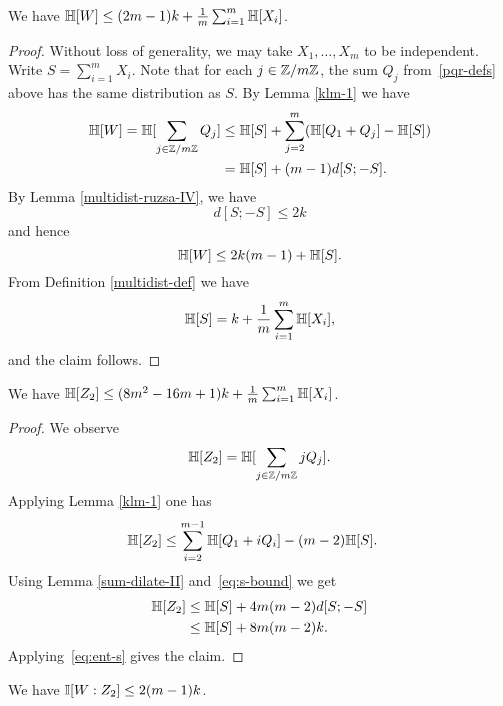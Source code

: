 \begin{lemma}[Entropy of $W$]\label{ent-w}  We have $\mathbb{H}[W] \leq (2m-1)k + \frac1m \sum_{i=1}^m \mathbb{H}[X_i]$.
\end{lemma}

\begin{proof} Without loss of generality, we may take $X_1,\dots,X_m$ to be independent. Write $S = \sum_{i=1}^m X_i$.
  Note that for each $j \in \mathbb{Z}/m\mathbb{Z}$, the sum $Q_j$ from~\eqref{pqr-defs} above has the same distribution as $S$.
  By Lemma \ref{klm-1} we have
  \begin{align*}
    \mathbb{H}[W] = \mathbb{H}[\sum_{j \in \mathbb{Z}/m\mathbb{Z}} Q_j]  & \leq \mathbb{H}[S] + \sum_{j=2}^m (\mathbb{H}[Q_1+Q_j] - \mathbb{H}[S]) \\ & = \mathbb{H}[S] + (m-1) d[S;-S].
  \end{align*}
  By Lemma \ref{multidist-ruzsa-IV}, we have
  \begin{equation}
    \label{eq:s-bound}
    d[S; -S] \leq 2 k
  \end{equation}
  and hence
  \[
    \mathbb{H}[W] \leq 2 k (m-1) + \mathbb{H}[S].
  \]
  From Definition \ref{multidist-def} we have
  \begin{equation}
    \label{eq:ent-s}
    \mathbb{H}[S] = k + \frac1m \sum_{i=1}^m \mathbb{H}[X_i],
  \end{equation}
  and the claim follows.
\end{proof}

\begin{lemma}[Entropy of $Z_2$]\label{ent-z2}  We have $\mathbb{H}[Z_2] \leq (8m^2-16m+1) k + \frac{1}{m} \sum_{i=1}^m \mathbb{H}[X_i]$.
\end{lemma}

\begin{proof}
  We observe
  \[
    \mathbb{H}[Z_2] = \mathbb{H}[\sum_{j \in \mathbb{Z}/m\mathbb{Z}} j Q_j].
  \]
  Applying Lemma \ref{klm-1} one has
  \begin{align*}
    \mathbb{H}[Z_2] &\leq \sum_{i=2}^{m-1} \mathbb{H}[Q_1 + i Q_i]  - (m-2) \mathbb{H}[S].
  \end{align*}
  Using Lemma \ref{sum-dilate-II} and~\eqref{eq:s-bound} we get
  \begin{align*}
    \mathbb{H}[Z_2]
              &\leq \mathbb{H}[S] + 4m (m-2) d[S;-S] \\
              &\leq \mathbb{H}[S] + 8m (m-2) k.
  \end{align*}
  Applying~\eqref{eq:ent-s} gives the claim.
\end{proof}

\begin{lemma}\label{mutual-w-z2}  We have  $\mathbb{I}[W : Z_2] \leq 2 (m-1) k$.
\end{lemma}

